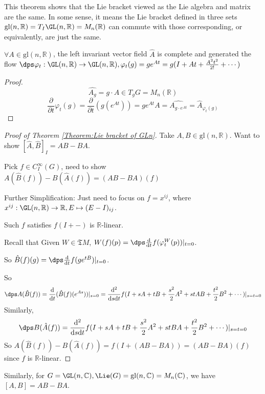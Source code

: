 \begin{remark}
    This theorem shows that the Lie bracket viewed as the Lie algebra and matrix are the same. In some sense, it means the Lie bracket defined in three sets  $ \mathrm{gl}(n,\mathbb{R})=T_I\GL(n,\mathbb
    R)=M_n(\mathbb{R}) $ can commute with those corresponding, or equivalently, are just the same. 
\end{remark}
\begin{lemma}
     $ \forall A\in \mathrm{gl}(n,\mathbb{R}) $, the left invariant vector field  $ \hat{A} $ is complete and generated the flow  $ \dps\varphi_t:\GL(n,\mathbb{R})\rightarrow \GL(n,\mathbb{R}), \varphi_t(g)=ge^{At}=g(I+At+\frac{A^2t^2}{2!}+\cdots) $   
\end{lemma}
\begin{proof}
     \[\hat{A_g}=g\cdot A\in T_gG=M_n(\mathbb{R})\]
      \[\frac{\partial}{\partial t}\varphi_t(g)=\frac{\partial}{\partial t}(g(e^{At}))=ge^{At}A=\hat{A_{g\cdot e^{At}}}=\hat{A}_{\varphi_t(g)}\]
\end{proof}
\begin{proof}[Proof of Theorem \ref{Theorem:Lie bracket of GLn}]
    Take  $ A,B\in \mathrm{gl}(n,\mathbb{R}) $. Want to show  $ [\hat{A},\hat{B}]_I=AB-BA $.
    
    Pick  $ f\in C^\infty_I(G) $, need to show  $ A(\hat{B}(f))-B(\hat{A}(f))=(AB-BA)(f) $
    
    Further Simplification: Just need to focus on  $ f=x^{ij} $, where  $ x^{ij}:\GL(n,\mathbb{R})\rightarrow \mathbb{R}, E\mapsto (E-I)_{ij} $.
    
    Such  $ f $ satisfies  $ f(I+-) $ is  $ \mathbb{R} $-linear.
    
    Recall that Given  $ W\in \mathfrak{T}M $,  $ W(f)(p)=\dps\frac{\mathrm{d}}{\mathrm{d}t}f(\varphi_t^W(p))|_{t=0} $.
    
    So  $ \hat{B}(f)(g)=\dps\frac{\mathrm{d}}{\mathrm{d}t}f(ge^{tB})|_{t=0} $.
    
    So  \[\dps A(\hat{B}(f)) =\frac{\mathrm{d}}{\mathrm{d}t}(\hat{B}(f)(e^{As}))|_{s=0}=\frac{\mathrm{d}^2}{\mathrm{d}s\mathrm{d}t}f(I+sA+tB+\frac{s^2}{2}A^2+stAB+\frac{t^2}{2}B^2+\cdots)|_{s=t=0}\]
    Similarly,
    \[\dps B(\hat{A}(f))=\frac{\mathrm{d}^2}{\mathrm{d}s\mathrm{d}t}f(I+sA+tB+\frac{s^2}{2}A^2+stBA+\frac{t^2}{2}B^2+\cdots)|_{s=t=0}\]
    So $ A(\hat{B}(f))-B(\hat{A}(f))=f(I+(AB-BA))=(AB-BA)(f) $ since  $ f $ is  $ \mathbb{R} $-linear.  
\end{proof}
Similarly, for  $ G=\GL(n,\mathbb{C}), \Lie(G)=\mathrm{gl}(n,\mathbb{C})=M_n(\mathbb{C}) $, we have  $ [A,B]=AB-BA $.
  
